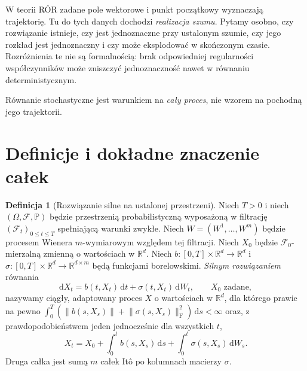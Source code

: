 \documentclass[11pt,a4paper,oneside]{report}
\numberwithin{equation}{chapter}
\theoremstyle{plain}
\theoremstyle{definition}
\newtheorem{definicja}{Definicja}[chapter]
\theoremstyle{remark}
\newcommand{\R}{\mathbb{R}}
\newcommand{\Prob}{\mathbb{P}}
\newcommand{\calF}{\mathcal{F}}
\newcommand{\dd}{\mathrm{d}}
\newcommand{\norm}[1]{\lVert #1\rVert}
\begin{document}
W teorii RÓR zadane pole wektorowe i punkt początkowy wyznaczają
trajektorię. Tu do tych danych dochodzi \emph{realizacja szumu}.
Pytamy osobno, czy rozwiązanie istnieje, czy jest jednoznaczne
przy ustalonym szumie, czy jego rozkład jest jednoznaczny i czy
może eksplodować w skończonym czasie. Rozróżnienia te nie są
formalnością: brak odpowiedniej regularności współczynników
może zniszczyć jednoznaczność nawet w równaniu deterministycznym.

\begin{center}
\par\smallskip\small Równanie stochastyczne jest warunkiem na \emph{cały proces}, nie wzorem na pochodną jego trajektorii.
\end{center}

\section{Definicje i dokładne znaczenie całek}\label{sec:volIII:05:02}
\begin{definicja}[Rozwiązanie silne na ustalonej przestrzeni]\label{def:volIII:05:01}
\label{def:sde-strong}
Niech $T>0$ i niech $(\Omega,\calF,\Prob)$ będzie
przestrzenią probabilistyczną wyposażoną w filtrację
$(\calF_t)_{0\le t\le T}$ spełniającą warunki zwykłe.
Niech $W=(W^1,\ldots,W^m)$ będzie procesem Wienera
$m$-wymiarowym względem tej filtracji. Niech $X_0$ będzie
$\calF_0$-mierzalną zmienną o wartościach w $\R^d$.
Niech $b:[0,T]\times\R^d\to\R^d$ i
$\sigma:[0,T]\times\R^d\to\R^{d\times m}$
będą funkcjami borelowskimi. \emph{Silnym rozwiązaniem} równania
\[
\dd X_t=b(t,X_t)\,\dd t+\sigma(t,X_t)\,\dd W_t,
\qquad X_0\text{ zadane},
\tag{5.1}\label{eq:sde}
\]
nazywamy ciągły, adaptowany proces $X$ o wartościach w $\R^d$,
dla którego prawie na pewno
$\int_0^T (\norm{b(s,X_s)}+\norm{\sigma(s,X_s)}_{\mathrm F}^2)\,\dd s<\infty$
oraz, z prawdopodobieństwem jeden jednocześnie dla wszystkich $t$,
\[
X_t=X_0+\int_0^tb(s,X_s)\,\dd s
       +\int_0^t\sigma(s,X_s)\,\dd W_s.
\]
Druga całka jest sumą $m$ całek Itô po kolumnach macierzy $\sigma$.
\end{definicja}
\end{document}
